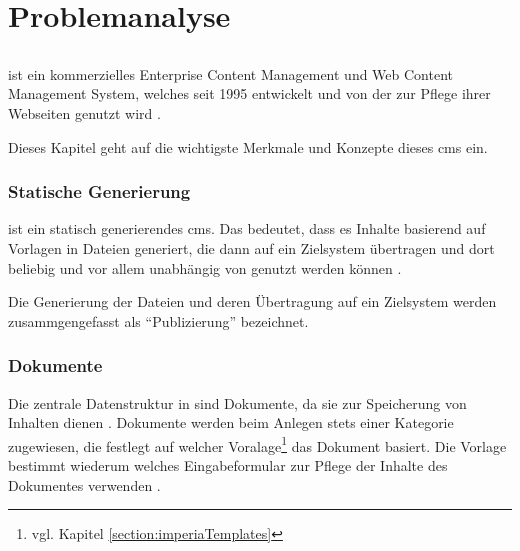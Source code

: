 \chapter{Problemanalyse}
    \label{chapter:ProblemAnalysis}
    \section{\imperia}
        {\imperia} ist ein kommerzielles Enterprise Content Management und
        Web Content Management System, welches seit 1995 entwickelt
        \cite{imperia:about, imperia:historie} und von 
        der {\fernUni} zur Pflege ihrer Webseiten genutzt wird
        \cite{fernUni:imperia}.
        
        Dieses Kapitel geht auf die wichtigste Merkmale und Konzepte
        dieses \gls{cms} ein.

        \subsection{Statische Generierung}
            \label{section:imperiaStaticGeneration}
            {\imperia} ist ein statisch generierendes \gls{cms}.
            Das bedeutet, dass es Inhalte basierend auf Vorlagen
            in Dateien generiert, die dann auf ein Zielsystem übertragen
            und dort beliebig und vor allem unabhängig von
            {\imperia} genutzt werden können
            \cite[Kapitel 1.1]{imperia:ecmd}.

            Die Generierung der Dateien und deren Übertragung auf ein Zielsystem
            werden zusammgengefasst als "`Publizierung"' bezeichnet.


        \subsection{Dokumente}
            \label{section:imperiaDocuments}
            Die zentrale Datenstruktur in {\imperia} sind Dokumente,
            da sie zur Speicherung von Inhalten dienen
            \cite[Kapitel 1.1]{imperia:ecmd}.
            Dokumente werden beim Anlegen stets einer Kategorie zugewiesen,
            die festlegt auf welcher Voralage\footnote{vgl. Kapitel \ref{section:imperiaTemplates}}
            das Dokument basiert.
            Die Vorlage bestimmt wiederum welches Eingabeformular
            {\editors} zur Pflege der Inhalte des Dokumentes verwenden
            \cite[Kapitel 1.1.4]{imperia:ecmd}.
            
